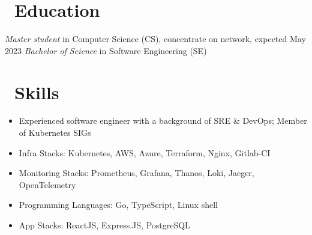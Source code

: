 \documentclass{resume}
\begin{document}



\section{\faGraduationCap\ Education}
\textit{Master student} in Computer Science (CS), concentrate on network, expected May 2023
\textit{Bachelor of Science} in Software Engineering (SE)

\section{\faCogs\ Skills}
\begin{itemize}[parsep=0.5ex]
  \item Experienced software engineer with a background of SRE \& DevOps; Member of Kubernetes SIGs
  \item Infra Stacks: Kubernetes, AWS, Azure, Terraform, Nginx, Gitlab-CI
  \item Monitoring Stacks: Prometheus, Grafana, Thanos, Loki, Jaeger, OpenTelemetry
  \item Programming Languages: Go, TypeScript, Linux shell
  \item App Stacks: ReactJS, Express.JS, PostgreSQL
\end{itemize}
\end{document}
